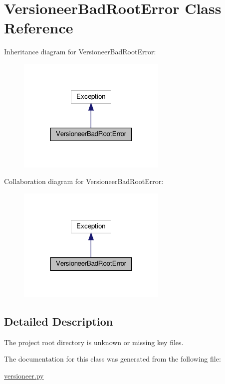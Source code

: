 \hypertarget{classversioneer_1_1VersioneerBadRootError}{}\section{Versioneer\+Bad\+Root\+Error Class Reference}
\label{classversioneer_1_1VersioneerBadRootError}


Inheritance diagram for Versioneer\+Bad\+Root\+Error\+:\nopagebreak
\begin{figure}[H]
\begin{center}
\leavevmode
\includegraphics[width=202pt]{classversioneer_1_1VersioneerBadRootError__inherit__graph}
\end{center}
\end{figure}


Collaboration diagram for Versioneer\+Bad\+Root\+Error\+:\nopagebreak
\begin{figure}[H]
\begin{center}
\leavevmode
\includegraphics[width=202pt]{classversioneer_1_1VersioneerBadRootError__coll__graph}
\end{center}
\end{figure}


\subsection{Detailed Description}
\begin{DoxyVerb}The project root directory is unknown or missing key files.\end{DoxyVerb}
 

The documentation for this class was generated from the following file\+:\begin{DoxyCompactItemize}
\item 
\hyperlink{versioneer_8py}{versioneer.\+py}\end{DoxyCompactItemize}
